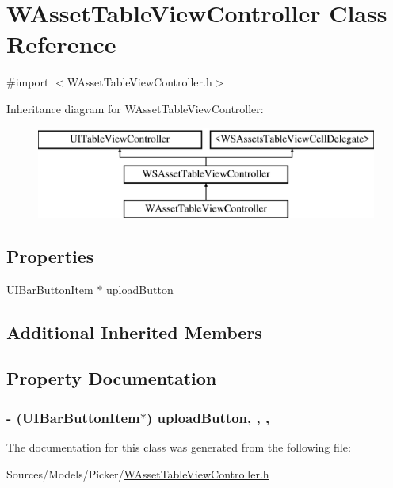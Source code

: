 \hypertarget{interface_w_asset_table_view_controller}{\section{W\-Asset\-Table\-View\-Controller Class Reference}
\label{interface_w_asset_table_view_controller}
}


{\ttfamily \#import $<$W\-Asset\-Table\-View\-Controller.\-h$>$}

Inheritance diagram for W\-Asset\-Table\-View\-Controller\-:\begin{figure}[H]
\begin{center}
\leavevmode
\includegraphics[height=3.000000cm]{interface_w_asset_table_view_controller}
\end{center}
\end{figure}
\subsection*{Properties}
\begin{DoxyCompactItemize}
\item 
U\-I\-Bar\-Button\-Item $\ast$ \hyperlink{interface_w_asset_table_view_controller_afab59c01d9bbf868fbad4eab794f0c8f}{upload\-Button}
\end{DoxyCompactItemize}
\subsection*{Additional Inherited Members}


\subsection{Property Documentation}
\hypertarget{interface_w_asset_table_view_controller_afab59c01d9bbf868fbad4eab794f0c8f}{
\subsubsection[{upload\-Button}]{\setlength{\rightskip}{0pt plus 5cm}-\/ (U\-I\-Bar\-Button\-Item$\ast$) upload\-Button\hspace{0.3cm}{\ttfamily [read]}, {\ttfamily [write]}, {\ttfamily [nonatomic]}, {\ttfamily [retain]}}}\label{interface_w_asset_table_view_controller_afab59c01d9bbf868fbad4eab794f0c8f}


The documentation for this class was generated from the following file\-:\begin{DoxyCompactItemize}
\item 
Sources/\-Models/\-Picker/\hyperlink{_w_asset_table_view_controller_8h}{W\-Asset\-Table\-View\-Controller.\-h}\end{DoxyCompactItemize}
